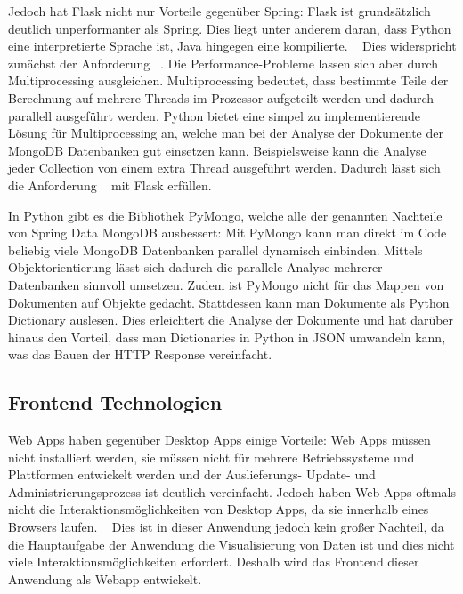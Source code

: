 Jedoch hat Flask nicht nur Vorteile gegenüber Spring:
Flask ist grundsätzlich deutlich unperformanter als Spring.
Dies liegt unter anderem daran, dass Python eine interpretierte Sprache ist, Java hingegen eine kompilierte.
~\autocite{sverker:rest_comparison}
Dies widerspricht zunächst der Anforderung ~.
Die Performance-Probleme lassen sich aber durch Multiprocessing ausgleichen.
Multiprocessing bedeutet, dass bestimmte Teile der Berechnung auf mehrere Threads im Prozessor aufgeteilt werden und dadurch parallell ausgeführt werden.
Python bietet eine simpel zu implementierende Lösung für Multiprocessing an, welche man bei der Analyse der Dokumente der MongoDB Datenbanken gut einsetzen kann.
Beispielsweise kann die Analyse jeder Collection von einem extra Thread ausgeführt werden.
Dadurch lässt sich die Anforderung ~ mit Flask erfüllen.

In Python gibt es die Bibliothek PyMongo, welche alle der genannten Nachteile von Spring Data MongoDB ausbessert:
Mit PyMongo kann man direkt im Code beliebig viele MongoDB Datenbanken parallel dynamisch einbinden.
Mittels Objektorientierung lässt sich dadurch die parallele Analyse mehrerer Datenbanken sinnvoll umsetzen.
Zudem ist PyMongo nicht für das Mappen von Dokumenten auf Objekte gedacht.
Stattdessen kann man Dokumente als Python Dictionary auslesen.
Dies erleichtert die Analyse der Dokumente und hat darüber hinaus den Vorteil, dass man Dictionaries in Python in JSON umwandeln kann, was das Bauen der HTTP Response vereinfacht.
~\autocite{mongodb:pymongo}

\subsection{Frontend Technologien}
\label{sec:verwendete_technologien_frontend}

Web Apps haben gegenüber Desktop Apps einige Vorteile:
Web Apps müssen nicht installiert werden, sie müssen nicht für mehrere Betriebssysteme und Plattformen entwickelt werden und der Auslieferungs- Update- und Administrierungsprozess ist deutlich vereinfacht.
Jedoch haben Web Apps oftmals nicht die Interaktionsmöglichkeiten von Desktop Apps, da sie innerhalb eines Browsers laufen.
~\autocite{zepeda2007desktop}
Dies ist in dieser Anwendung jedoch kein großer Nachteil, da die Hauptaufgabe der Anwendung die Visualisierung von Daten ist und dies nicht viele Interaktionsmöglichkeiten erfordert.
Deshalb wird das Frontend dieser Anwendung als Webapp entwickelt.

